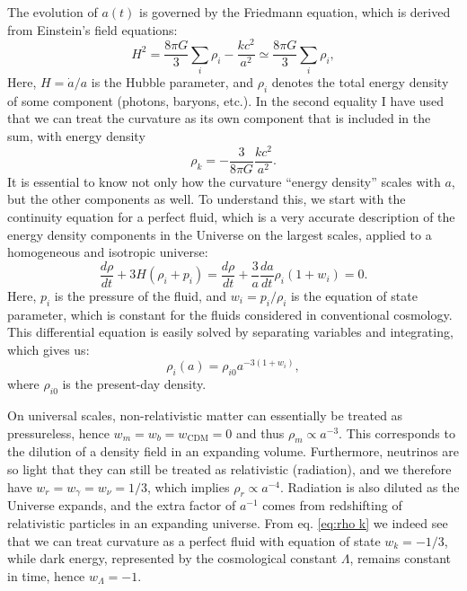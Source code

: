 \documentclass{aa}
\begin{document}
The evolution of $a(t)$ is governed by the Friedmann equation, which is derived from Einstein's field equations:
\begin{equation}
    H^2 = \frac{8\pi G}{3} \sum_{i}\rho_i - \frac{k c^2}{a^2} \simeq \frac{8\pi G}{3} \sum_{i}\rho_i,
\end{equation}
Here, $H = \dot{a}/a$ is the Hubble parameter, and $\rho_i$ denotes the total energy density of some component (photons, baryons, etc.). In the second equality I have used that we can treat the curvature as its own component that is included in the sum, with energy density
\begin{equation}
  \rho_k = -\frac{3}{8\pi G}\frac{k c^2}{a^2}. \label{eq:rho k}
\end{equation}
It is essential to know not only how the curvature ``energy density'' scales with $a$, but the other components as well. To understand this, we start with the continuity equation for a perfect fluid, which is a very accurate description of the energy density components in the Universe on the largest scales, applied to a homogeneous and isotropic universe:
\begin{equation}
  \frac{d\rho}{dt} + 3H (\rho_i+ p_i) = \frac{d\rho}{dt} + \frac{3}{a}\frac{da}{dt} \rho_i(1 + w_i) = 0.
\end{equation}
Here, $p_i$ is the pressure of the fluid, and $w_i=p_i/\rho_i$ is the equation of state parameter, which is constant for the fluids considered in conventional cosmology. This differential equation is easily solved by separating variables and integrating, which gives us:
\begin{equation}
  \rho_i(a) = \rho_{i0} a^{-3(1+w_i)},
\end{equation}
where $\rho_{i0}$ is the present-day density.

On universal scales, non-relativistic matter can essentially be treated as pressureless, hence $w_m = w_b=w_\text{CDM}=0$ and thus $\rho_m \propto a^{-3}$. This corresponds to the dilution of a density field in an expanding volume. Furthermore, neutrinos are so light that they can still be treated as relativistic (radiation), and we therefore have $w_r=w_\gamma=w_\nu=1/3$, which implies $\rho_r\propto a^{-4}$. Radiation is also diluted as the Universe expands, and the extra factor of $a^{-1}$ comes from redshifting of relativistic particles in an expanding universe. From eq. \eqref{eq:rho k} we indeed see that we can treat curvature as a perfect fluid with equation of state $w_k=-1/3$, while dark energy, represented by the cosmological constant $\Lambda$, remains constant in time, hence $w_\Lambda=-1$.
\end{document}
